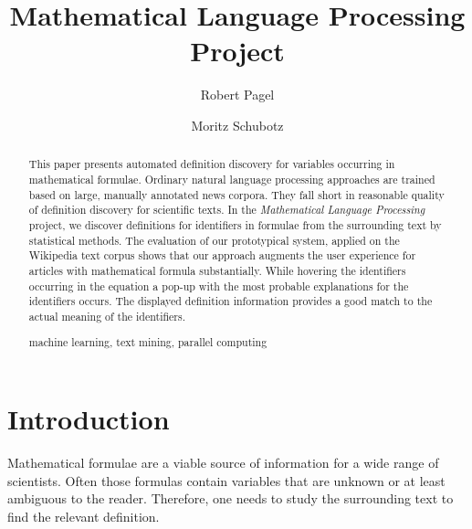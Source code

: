 \documentclass[runningheads]{llncs}
\newcommand{\keywords}[1]{\par\addvspace\baselineskip
\noindent\keywordname\enspace\ignorespaces#1}
\begin{document}
\mainmatter

\title{Mathematical Language Processing \\ Project}

\author{Robert Pagel \and Moritz Schubotz}



\maketitle


\begin{abstract}
This paper presents automated definition discovery for
variables occurring in mathematical formulae. Ordinary natural language
processing approaches are trained based on large, manually annotated news
corpora. They fall short in reasonable quality of definition discovery for
scientific texts. In the \emph{Mathematical Language Processing} project, we
discover definitions
for identifiers in formulae from the surrounding text by statistical methods.
The evaluation of our prototypical system, applied on the Wikipedia text
corpus shows that our approach augments the user experience for articles with
mathematical formula substantially. While hovering the identifiers occurring
in the equation a pop-up with the most probable explanations for the
identifiers occurs. The displayed definition information provides a good match
to the actual meaning of the identifiers.
\keywords{machine learning, text mining, parallel computing}
\end{abstract}


\section{Introduction}

Mathematical formulae are a viable source of information for a wide range of
scientists. Often those formulas contain variables that are unknown or at
least ambiguous to the reader. Therefore, one needs to study the surrounding
text to find the relevant definition.
\end{document}
